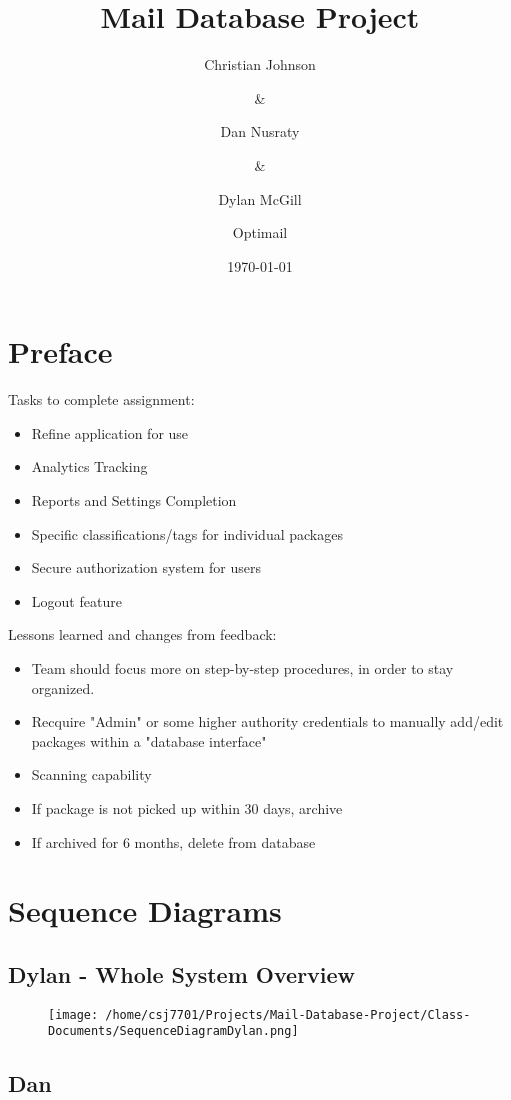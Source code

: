 \documentclass[11pt]{article}
\author{Christian Johnson\and\&\and Dan Nusraty\and\&\and Dylan McGill\and\newline Optimail}
\date{\today}
\title{Mail Database Project}
\begin{document}
\maketitle
\newpage
\section*{Preface}
\label{sec:org7461905}
Tasks to complete assignment:
\begin{itemize}
\item Refine application for use
\item Analytics Tracking
\item Reports and Settings Completion
\item Specific classifications/tags for individual packages
\item Secure authorization system for users
\item Logout feature
\end{itemize}


Lessons learned and changes from feedback:
\begin{itemize}
\item Team should focus more on step-by-step procedures, in order to stay organized.
\item Recquire "Admin" or some higher authority credentials to manually add/edit packages within a "database interface"
\item Scanning capability
\item If package is not picked up within 30 days, archive
\item If archived for 6 months, delete from database
\end{itemize}


\section*{Sequence Diagrams}
\label{sec:orgc332bd3}
\subsection*{Dylan - Whole System Overview}
\label{sec:org50d46b9}
\begin{figure}[htbp]
\centering
\texttt{[image: /home/csj7701/Projects/Mail-Database-Project/Class-Documents/SequenceDiagramDylan.png]}
\bicaption{---}
\end{figure}

\subsection*{Dan}
\label{sec:orgda4c558}
\end{document}
